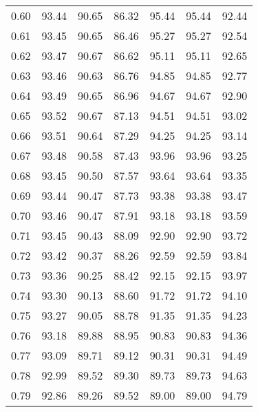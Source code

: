 \begin{tabular}{|c|c|c|c|c|c|c|}
      0.60 &     93.44 &     90.65 &      86.32 &   95.44 &      95.44 &         92.44 \\
      0.61 &     93.45 &     90.65 &      86.46 &   95.27 &      95.27 &         92.54 \\
      0.62 &     93.47 &     90.67 &      86.62 &   95.11 &      95.11 &         92.65 \\
      0.63 &     93.46 &     90.63 &      86.76 &   94.85 &      94.85 &         92.77 \\
      0.64 &     93.49 &     90.65 &      86.96 &   94.67 &      94.67 &         92.90 \\
      0.65 &     93.52 &     90.67 &      87.13 &   94.51 &      94.51 &         93.02 \\
      0.66 &     93.51 &     90.64 &      87.29 &   94.25 &      94.25 &         93.14 \\
      0.67 &     93.48 &     90.58 &      87.43 &   93.96 &      93.96 &         93.25 \\
      0.68 &     93.45 &     90.50 &      87.57 &   93.64 &      93.64 &         93.35 \\
      0.69 &     93.44 &     90.47 &      87.73 &   93.38 &      93.38 &         93.47 \\
      0.70 &     93.46 &     90.47 &      87.91 &   93.18 &      93.18 &         93.59 \\
      0.71 &     93.45 &     90.43 &      88.09 &   92.90 &      92.90 &         93.72 \\
      0.72 &     93.42 &     90.37 &      88.26 &   92.59 &      92.59 &         93.84 \\
      0.73 &     93.36 &     90.25 &      88.42 &   92.15 &      92.15 &         93.97 \\
      0.74 &     93.30 &     90.13 &      88.60 &   91.72 &      91.72 &         94.10 \\
      0.75 &     93.27 &     90.05 &      88.78 &   91.35 &      91.35 &         94.23 \\
      0.76 &     93.18 &     89.88 &      88.95 &   90.83 &      90.83 &         94.36 \\
      0.77 &     93.09 &     89.71 &      89.12 &   90.31 &      90.31 &         94.49 \\
      0.78 &     92.99 &     89.52 &      89.30 &   89.73 &      89.73 &         94.63 \\
      0.79 &     92.86 &     89.26 &      89.52 &   89.00 &      89.00 &         94.79 \\

\end{tabular}
